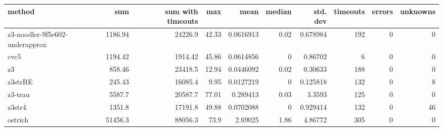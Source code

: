 \begin{tabular}{lrrrrrrrrr}
\hline
 method                         &      sum &   sum with timeouts &   max &      mean &   median &   std. dev &   timeouts &   errors &   unknowns \\
\hline
 z3-noodler-9f5e602-underapprox &  1186.94 &            24226.9  & 42.33 & 0.0616913 &     0.02 &   0.678984 &        192 &        0 &          0 \\
 cvc5                           &  1194.42 &             1914.42 & 45.86 & 0.0614856 &     0    &   0.86702  &          6 &        0 &          0 \\
 z3                             &   858.46 &            23418.5  & 12.94 & 0.0446092 &     0.02 &   0.30633  &        188 &        0 &          0 \\
 z3strRE                        &   245.43 &            16085.4  &  9.95 & 0.0127219 &     0    &   0.125818 &        132 &        0 &          8 \\
 z3-trau                        &  5587.7  &            20587.7  & 77.01 & 0.289413  &     0.03 &   3.3593   &        125 &        0 &          0 \\
 z3str4                         &  1351.8  &            17191.8  & 49.88 & 0.0702088 &     0    &   0.929414 &        132 &        0 &         46 \\
 ostrich                        & 51456.3  &            88056.3  & 73.9  & 2.69025   &     1.86 &   4.86772  &        305 &        0 &          0 \\
\hline
\end{tabular}
